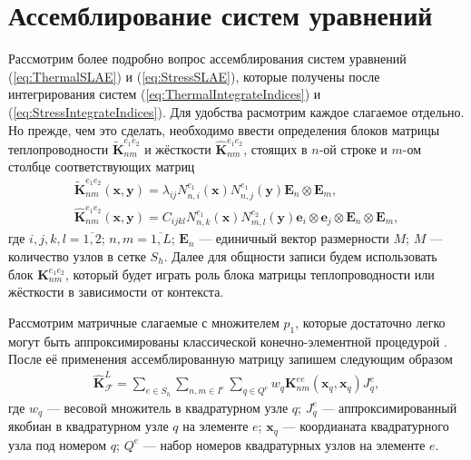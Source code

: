 \section{Ассемблирование систем уравнений}\label{sec:NumericalMethods/SLAEAssembling}

Рассмотрим более подробно вопрос ассемблирования систем уравнений (\ref{eq:ThermalSLAE}) и (\ref{eq:StressSLAE}), которые получены после интегрирования систем (\ref{eq:ThermalIntegrateIndices}) и (\ref{eq:StressIntegrateIndices}). Для удобства расмотрим каждое слагаемое отдельно. Но прежде, чем это сделать, необходимо ввести определения блоков матрицы теплопроводности $\widetilde{\textbf{K}}_{nm}^{e_1 e_2}$ и жёсткости $\widehat{\textbf{K}}_{nm}^{e_1 e_2}$, стоящих в $n$-ой строке и $m$-ом столбце соответствующих матриц
\begin{gather}
	\label{eq:ThermalBlock}
	\widetilde{\textbf{K}}_{nm}^{e_1 e_2} (\boldsymbol{x}, \boldsymbol{y}) =
	\lambda_{ij} N_{n,i}^{e_1} (\boldsymbol{x}) N_{n,j}^{e_1} (\boldsymbol{y})
	\boldsymbol{E}_n \otimes \boldsymbol{E}_m, \\
	\label{eq:StressBlock}
	\widehat{\textbf{K}}_{nm}^{e_1 e_2} (\boldsymbol{x}, \boldsymbol{y}) = 
	C_{ijkl} N_{n,k}^{e_1} (\boldsymbol{x}) N_{m,l}^{e_2} (\boldsymbol{y}) \boldsymbol{e}_i \otimes \boldsymbol{e}_j \otimes \boldsymbol{E}_n \otimes \boldsymbol{E}_m,
\end{gather}
где $i,j,k,l = \overline{1,2}$; $n,m = \overline{1,L}$; $\boldsymbol{E}_n$ --- единичный вектор размерности $M$; $M$ --- количество узлов в сетке $S_h$. Далее для общности записи будем использовать блок $\textbf{K}_{nm}^{e_1 e_2}$, который будет играть роль блока матрицы теплопроводности или жёсткости в зависимости от контекста.

Рассмотрим матричные слагаемые с множителем $p_1$, которые достаточно легко могут быть аппроксимированы классической конечно-элементной процедурой \cite{Zienkiewicz, Bathe}. После её применения ассемблированную матрицу запишем следующим образом
\begin{gather}
	\label{eq:LocalMatrix}
	\widehat{\textbf{K}}^L_{\mathcal{F}} =
	\sum\limits_{e \in S_h}
	\sum\limits_{n,m \in I^e}
	\sum\limits_{q \in Q^e}
	w_q \textbf{K}^{ee}_{nm} (\boldsymbol{x}_q, \boldsymbol{x}_q) J_q^e,
\end{gather}
где $w_q$ --- весовой множитель в квадратурном узле $q$;
$J_q^e$ --- аппроксимированный якобиан в квадратурном узле $q$ на элементе $e$;
$\boldsymbol{x}_q$ --- коордианата квадратурного узла под номером $q$;
$Q^e$ --- набор номеров квадратурных узлов на элементе $e$.

